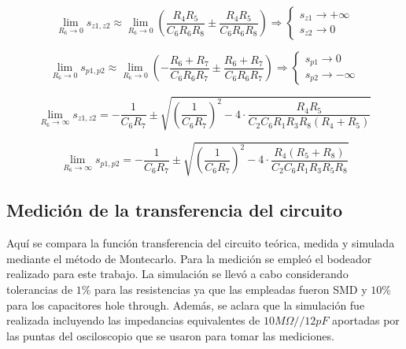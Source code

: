 \begin{equation}
\lim_{R_6\to 0} s_{z1,z2} \approx \lim_{R_6\to 0}\left( \frac{R_4 R_5}{C_6 R_6 R_8} \pm \frac{R_4 R_5}{C_6 R_6 R_8}\right) \Rightarrow 
\begin{cases} 
s_{z1} \to +\infty\\
s_{z2} \to 0
\end{cases}
\end{equation}

\begin{equation}
\lim_{R_6\to 0} s_{p1,p2} \approx 	\lim_{R_6\to 0} \left( -\frac{R_6 + R_7}{C_6 R_6 R_7} \pm \frac{R_6 + R_7}{C_6 R_6 R_7} \right) \Rightarrow
\begin{cases} 
s_{p1} \to 0\\
s_{p2} \to -\infty
\end{cases}
\end{equation}

\begin{equation}
\lim_{R_6\to\infty}s_{z1,z2} =  -\frac{1}{C_6 R_7} \pm \sqrt{\left(\frac{1}{C_6 R_7} \right)^2 - 4 \cdot \frac{R_4 R_5}{C_2 C_6 R_1 R_3 R_8(R_4 + R_5)}}
\end{equation}

\begin{equation}
\lim_{R_6\to\infty}s_{p1,p2} =  - \frac{1}{C_6 R_7} \pm \sqrt{\left(\frac{1}{C_6 R_7}\right)^2 - 4 \cdot \frac{R_4 (R_5 + R_8)}{C_2 C_6 R_1 R_3 R_5 R_8 }}
\end{equation}



\subsection{Medici\'on de la transferencia del circuito}

Aqu\'i se compara la funci\'on transferencia del circuito te\'orica, 
medida y simulada mediante el m\'etodo de Montecarlo. Para la medici\'on se emple\'o el bodeador realizado para este trabajo. La simulaci\'on se llev\'o a cabo considerando tolerancias de $1\%$ para las resistencias ya que las empleadas fueron SMD y $10\%$ para los capacitores hole through. Adem\'as, se aclara que la simulaci\'on fue realizada incluyendo las impedancias equivalentes de $10M\Omega // 12pF$ aportadas por las puntas del osciloscopio que se usaron para tomar las mediciones.

